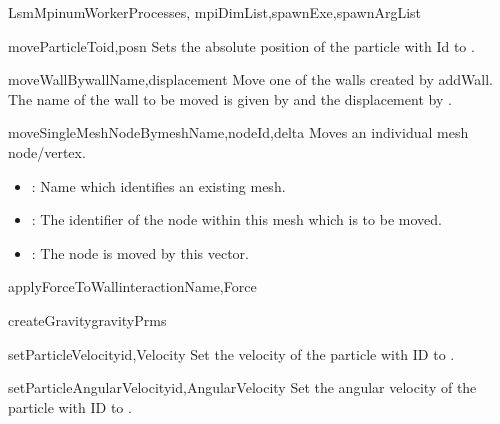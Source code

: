\documentclass{manual}
\begin{document}
\begin{classdesc}{LsmMpi}{numWorkerProcesses, mpiDimList,spawnExe,spawnArgList}
\begin{methoddesc}{moveParticleTo}{id,posn}
Sets the absolute position of the particle with Id  to .
\end{methoddesc}

\begin{methoddesc}{moveWallBy}{wallName,displacement}
Move one of the walls created by addWall. The name of the wall to be moved is given by  and the displacement by .
\end{methoddesc}

\begin{methoddesc}{moveSingleMeshNodeBy}{meshName,nodeId,delta}
Moves an individual mesh node/vertex.
\begin{itemize}
\item {}: Name which identifies an existing mesh.
\item {}: The identifier of the node within this mesh which is to be moved.
\item {}: The node is moved by this vector.
\end{itemize}
\end{methoddesc}

\begin{methoddesc}{applyForceToWall}{interactionName,Force}
\end{methoddesc}

\begin{methoddesc}{createGravity}{gravityPrms}

\end{methoddesc}

\begin{methoddesc}{setParticleVelocity}{id,Velocity}
Set the velocity of the particle with ID  to .
\end{methoddesc}

\begin{methoddesc}{setParticleAngularVelocity}{id,AngularVelocity}
Set the angular velocity of the particle with ID  to .
\end{methoddesc}


\end{classdesc}
\end{document}
